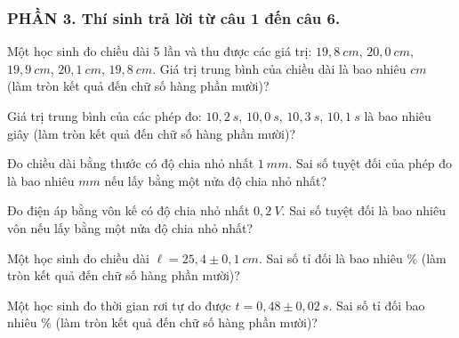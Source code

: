 \subsubsection*{PHẦN 3. Thí sinh trả lời từ câu 1 đến câu 6.}
\setcounter{ex}{0}
\begin{ex}%
Một học sinh đo chiều dài 5 lần và thu được các giá trị: $19,8\ cm$, $20,0\ cm$, $19,9\ cm$, $20,1\ cm$, $19,8\ cm$. Giá trị trung bình của chiều dài là bao nhiêu $cm$ (làm tròn kết quả đến chữ số hàng phần mười)?
\end{ex}

\begin{ex}%
Giá trị trung bình của các phép đo: $10,2\ s$, $10,0\ s$, $10,3\ s$, $10,1\ s$ là bao nhiêu giây (làm tròn kết quả đến chữ số hàng phần mười)?
\end{ex}

\begin{ex}%
Đo chiều dài bằng thước có độ chia nhỏ nhất $1\ mm$. Sai số tuyệt đối của phép đo là bao nhiêu $mm$ nếu lấy bằng một nửa độ chia nhỏ nhất?
\end{ex}

\begin{ex}%
Đo điện áp bằng vôn kế có độ chia nhỏ nhất $0,2\ V$. Sai số tuyệt đối là bao nhiêu vôn nếu lấy bằng một nửa độ chia nhỏ nhất?
\end{ex}

\begin{ex}%
Một học sinh đo chiều dài $\ell = 25,4 \pm 0,1\ cm$. Sai số tỉ đối là bao nhiêu $\%$ (làm tròn kết quả đến chữ số hàng phần mười)?
\end{ex}

\begin{ex}%
Một học sinh đo thời gian rơi tự do được $t = 0,48 \pm 0,02\ s$. Sai số tỉ đối bao nhiêu $\%$  (làm tròn kết quả đến chữ số hàng phần mười)?
\end{ex}









